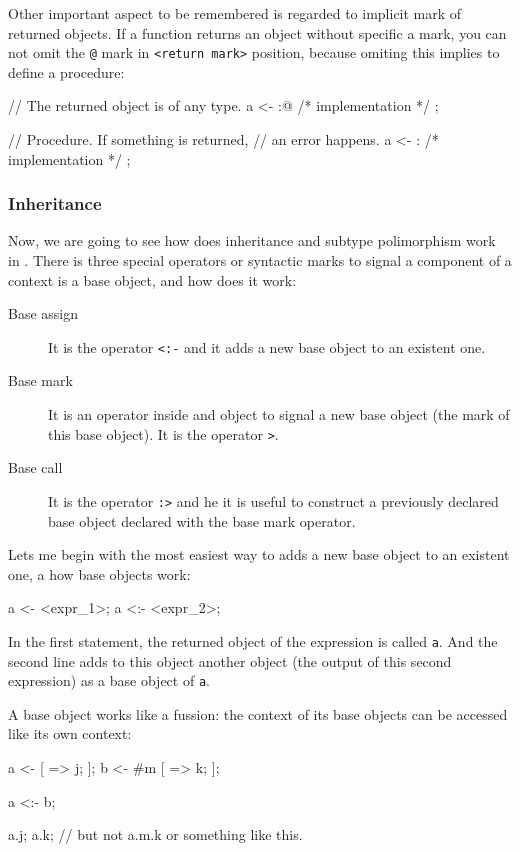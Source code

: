 \documentclass{article}
\begin{document}
Other important aspect to be remembered is regarded to implicit mark of returned
objects. If a function returns an object without specific a mark, you can not
omit the \texttt{@} mark in \texttt{<return mark>} position, because omiting
this implies to define a procedure:

\begin{faupp2}
  // The returned object is of any type.
  a <- :@ { /* implementation */ };

  // Procedure. If something is returned,
  // an error happens.
  a <- :{ /* implementation */ };
\end{faupp2}

\subsubsection{Inheritance}
Now, we are going to see how does inheritance and subtype polimorphism work
in \faupp. There is three special operators or syntactic marks to signal a
component of a context is a base object, and how does it work:

\begin{description}
  \item[Base assign] It is the operator \texttt{<:-} and it adds a new base
    object to an existent one.
  \item[Base mark] It is an operator inside and object to signal a new base
    object (the mark of this base object). It is the operator \texttt{>}.
  \item[Base call] It is the operator \texttt{:>} and he it is useful to
    construct a previously declared base object declared with the base mark
    operator.
\end{description}

Lets me begin with the most easiest way to adds a new base object to an existent
one, a how base objects work:

\begin{faupp2}
  a <- <expr_1>;
  a <:- <expr_2>;
\end{faupp2}

In the first statement, the returned object of the expression is called
\texttt{a}. And the second line adds to this object another object (the output
of this second expression) as a base object of \texttt{a}.

A base object works like a fussion: the context of its base objects can be
accessed like its own context:

\begin{faupp2}
  a <- [ => j; ];
  b <- #m [ => k; ];

  a <:- b;

  a.j;
  a.k;
  // but not a.m.k or something like this.
\end{faupp2}
\end{document}
